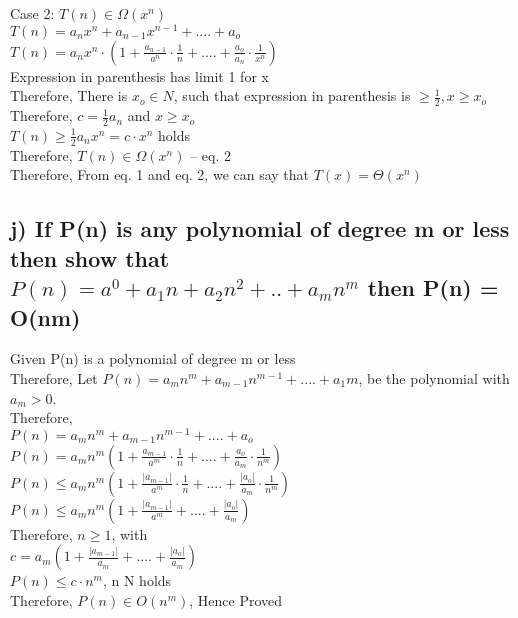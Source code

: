 \documentclass[11pt]{article}
\begin{document}
Case 2: $T(n) \in \Omega(x^n)$ \\
$T(n) = a_nx^n + a_{n-1}x^{n-1} + .... + a_o$ \\
$T(n) = a_nx^n \cdot ( 1 + \frac{a_{n-1}}{a^n} \cdot \frac{1}{n} + .... + \frac{a_o}{a_n} \cdot \frac{1}{x^n} )$ \\
Expression in parenthesis has limit 1 for x \rightarrow \infty \\
Therefore, There is ${x_o} \in N$, such that expression in parenthesis is $\geq \frac{1}{2}, x \geq{x_o}$ \\

Therefore, $c = \frac{1}{2}a_n$ and $ x \geq{x_o}$ \\
$T(n) \geq \frac{1}{2}a_nx^n = c \cdot x^n$ holds \\

Therefore, $T(n) \in \Omega(x^n)$ -- eq. 2 \\

Therefore, From eq. 1 and eq. 2, we can say that $T(x) = \Theta(x^n)$



\subsection{j) If P(n) is any polynomial of degree m or less then show that $P(n) = a^0 + a_1n + a_2n^2 + .. + a_mn^m$ then P(n) = O(nm) }

Given P(n) is a polynomial of degree m or less \\
Therefore, Let $P(n) = a_mn^m + a_{m-1}n^{m-1} + .... + a_1m$, be the polynomial with $a_m > 0$. \\
Therefore, \\
$P(n) = a_mn^m + a_{m-1}n^{m-1} + .... + a_o$ \\
$P(n) = a_mn^m ( 1 + \frac{a_{m-1}}{a^m} \cdot \frac{1}{n} + .... + \frac{a_o}{a_m} \cdot \frac{1}{n^m} ) $ \\
$P(n) \leq a_mn^m ( 1 + \frac{|a_{m-1}|}{a^m} \cdot \frac{1}{n} + .... + \frac{|a_o|}{a_m} \cdot \frac{1}{n^m} ) $ \\
$P(n) \leq a_mn^m ( 1 + \frac{|a_{m-1}|}{a^m} + .... + \frac{|a_o|}{a_m} )$ \\
Therefore, $n \geq{1}$, with \\
$c = a_m (1 + \frac{|a_{m-1}|}{a_m} + .... + \frac{|a_o|}{a_m})$ \\
$P(n) \leq c \cdot n^m $, n \in N holds \\
Therefore, $P(n) \in O(n^m)$, Hence Proved 
\end{document}
